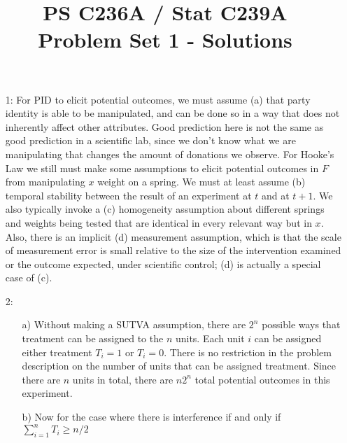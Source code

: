 \documentclass{article}
\begin{document}
\title{PS C236A / Stat C239A \\ Problem Set 1 - Solutions}
\date{}
\maketitle

\begin{itemize}
\item[1:] For PID to elicit potential outcomes, we must assume (a)
  that party identity is able to be manipulated, and can be done so in
  a way that does not inherently affect other attributes.  Good
  prediction here is not the same as good prediction in a scientific
  lab, since we don't know what we are manipulating that changes the
  amount of donations we observe.  For Hooke's Law we still must make
  some assumptions to elicit potential outcomes in $F$ from
  manipulating $x$ weight on a spring.  We must at least assume (b)
  temporal stability between the result of an experiment at $t$ and at
  $t+1$.  We also typically invoke a (c) homogeneity assumption about
different springs and weights being tested that are identical in every
relevant way but in $x$.  Also, there is an implicit (d) measurement
assumption, which is that the scale of measurement error is small
relative to the size of the intervention examined or the outcome
expected, under scientific control; (d) is actually a special case of
(c).  


















  \item[2:]  
  \begin{itemize}
  \item[a)]
    Without making a SUTVA assumption, there are $2^n$ possible ways that treatment can be assigned to the $n$ units.
    Each unit $i$ can be assigned either treatment $T_i = 1$ or $T_i = 0$.
    There is no restriction in the problem description on the number of units that can be assigned treatment.
    Since there are $n$ units in total, there are $n2^n$ total potential outcomes in this experiment.
  \item[b)]
    Now for the case where there is interference if and only if $\sum_{i=1}^n T_i \geq n/2$
  

\end{itemize}
\end{itemize}
\end{document}
